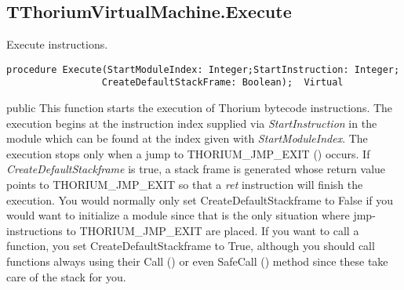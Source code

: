 \subsection{TThoriumVirtualMachine.Execute}
\label{thoriumcorepkg:thorium:tthoriumvirtualmachine:execute}
\begin{FPCList}
\Synopsis
Execute instructions.\Declaration 

\begin{verbatim}
procedure Execute(StartModuleIndex: Integer;StartInstruction: Integer;
                 CreateDefaultStackFrame: Boolean);  Virtual
\end{verbatim}
\Visibility
public
\Description
This function starts the execution of Thorium bytecode instructions. The execution begins at the instruction index supplied via \textit{StartInstruction} in the module which can be found at the index given with \textit{StartModuleIndex}. The execution stops only when a jump to THORIUM\_JMP\_EXIT (\pageref{thoriumcorepkg:thorium}) occurs. If \textit{CreateDefaultStackframe} is true, a stack frame is generated whose return value points to THORIUM\_JMP\_EXIT so that a \textit{ret} instruction will finish the execution.  You would normally only set CreateDefaultStackframe to False if you would want to initialize a module since that is the only situation where jmp-instructions to THORIUM\_JMP\_EXIT are placed. If you want to call a function, you set CreateDefaultStackframe to True, although you should call functions always using their Call (\pageref{thoriumcorepkg:thorium:tthoriumfunction:call}) or even SafeCall (\pageref{thoriumcorepkg:thorium:tthoriumfunction:safecall}) method since these take care of the stack for you.\end{FPCList}
